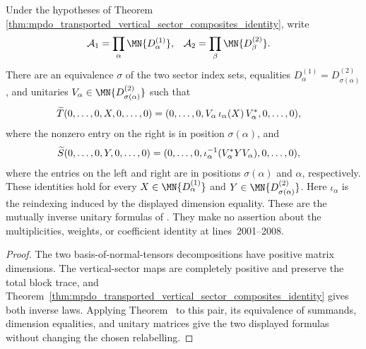 \begin{lemma}
    \label{thm:mpdo_transported_vertical_sector_unitary_relabeling}
    \leanok
    Under the hypotheses of Theorem~
    \ref{thm:mpdo_transported_vertical_sector_composites_identity}, write
    \begin{align}
        \mathcal A_1 & =\prod_{\alpha}\MN{D^{(1)}_\alpha},
                     &
        \mathcal A_2 & =\prod_{\beta}\MN{D^{(2)}_\beta}.
        \notag
    \end{align}
    There are an equivalence $\sigma$ of the two sector index sets, equalities
    $D^{(1)}_\alpha=D^{(2)}_{\sigma(\alpha)}$, and unitaries
    $V_\alpha\in \MN{D^{(2)}_{\sigma(\alpha)}}$ such that
    \begin{align}
        \widetilde T(0,\ldots,0,X,0,\ldots,0)
         & =(0,\ldots,0,V_\alpha\,\iota_\alpha(X)\,V_\alpha^*,0,\ldots,0),
        \notag
    \end{align}
    where the nonzero entry on the right is in position $\sigma(\alpha)$, and
    \begin{align}
        \widetilde S(0,\ldots,0,Y,0,\ldots,0)
         & =(0,\ldots,0,\iota_\alpha^{-1}
        (V_\alpha^*YV_\alpha),0,\ldots,0),
        \notag
    \end{align}
    where the entries on the left and right are in positions $\sigma(\alpha)$
    and $\alpha$, respectively. These identities hold for every
    $X\in \MN{D^{(1)}_\alpha}$ and
    $Y\in \MN{D^{(2)}_{\sigma(\alpha)}}$.
    Here $\iota_\alpha$ is the reindexing induced by the displayed dimension
    equality. These are the mutually inverse unitary formulas of
    \cite[Appendix~C.4, line~1997]{Cirac2016MPDO_arXiv}. They make no assertion
    about the multiplicities, weights, or coefficient identity at
    lines~2001--2008.
\end{lemma}

\begin{proof}\leanok
    The two basis-of-normal-tensors decompositions have positive matrix
    dimensions. The vertical-sector maps are completely positive and preserve
    the total block trace, and
    Theorem~\ref{thm:mpdo_transported_vertical_sector_composites_identity}
    gives both inverse laws.
    Applying Theorem~\cite[``Unitary action of an invertible CPTP map'']{QICLean2026Blueprint} to this
    pair, its equivalence of summands, dimension equalities, and unitary
    matrices give the two displayed formulas without changing the chosen
    relabelling.
\end{proof}

